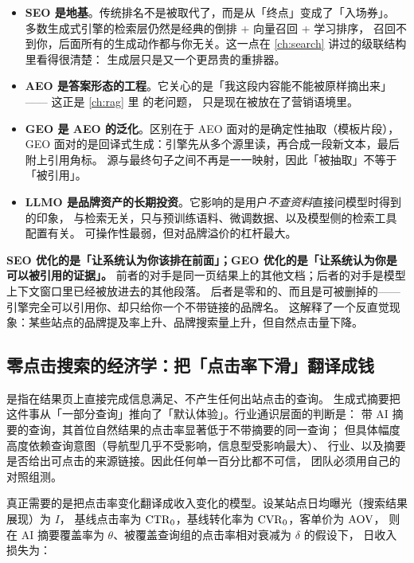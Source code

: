 \begin{itemize}
  \item \textbf{SEO 是地基}。传统排名不是被取代了，而是从「终点」变成了「入场券」。
        多数生成式引擎的检索层仍然是经典的倒排 + 向量召回 + 学习排序，
        召回不到你，后面所有的生成动作都与你无关。这一点在 \cref{ch:search} 讲过的级联结构里看得很清楚：
        生成层只是又一个更昂贵的重排器。
  \item \textbf{AEO 是答案形态的工程}。它关心的是「我这段内容能不能被原样摘出来」——
        这正是 \cref{ch:rag} 里  的老问题，
        只是现在被放在了营销语境里。
  \item \textbf{GEO 是 AEO 的泛化}。区别在于 AEO 面对的是确定性抽取（模板片段），
        GEO 面对的是回译式生成：引擎先从多个源里读，再合成一段新文本，最后附上引用角标。
        源与最终句子之间不再是一一映射，因此「被抽取」不等于「被引用」。
  \item \textbf{LLMO 是品牌资产的长期投资}。它影响的是用户\emph{不查资料}直接问模型时得到的印象，
        与检索无关，只与预训练语料、微调数据、以及模型侧的检索工具配置有关。
        可操作性最弱，但对品牌溢价的杠杆最大。
\end{itemize}

\begin{keypoint}
\textbf{SEO 优化的是「让系统认为你该排在前面」；GEO 优化的是「让系统认为你是可以被引用的证据」。}
前者的对手是同一页结果上的其他文档；后者的对手是模型上下文窗口里已经被放进去的其他段落。
后者是零和的、而且是可被删掉的——引擎完全可以引用你、却只给你一个不带链接的品牌名。
这解释了一个反直觉现象：某些站点的品牌提及率上升、品牌搜索量上升，但自然点击量下降。
\end{keypoint}

\subsection{零点击搜索的经济学：把「点击率下滑」翻译成钱}

是指在结果页上直接完成信息满足、不产生任何出站点击的查询。
生成式摘要把这件事从「一部分查询」推向了「默认体验」。行业通识层面的判断是：
带 AI 摘要的查询，其首位自然结果的点击率显著低于不带摘要的同一查询；
但具体幅度高度依赖查询意图（导航型几乎不受影响，信息型受影响最大）、
行业、以及摘要是否给出可点击的来源链接。因此任何单一百分比都不可信，
团队必须用自己的对照组测。

真正需要的是把点击率变化翻译成收入变化的模型。设某站点日均曝光（搜索结果展现）为 $I$，
基线点击率为 $\operatorname{CTR}_0$，基线转化率为 $\operatorname{CVR}_0$，客单价为 $\operatorname{AOV}$，
则在 AI 摘要覆盖率为 $\theta$、被覆盖查询组的点击率相对衰减为 $\delta$ 的假设下，
日收入损失为：

